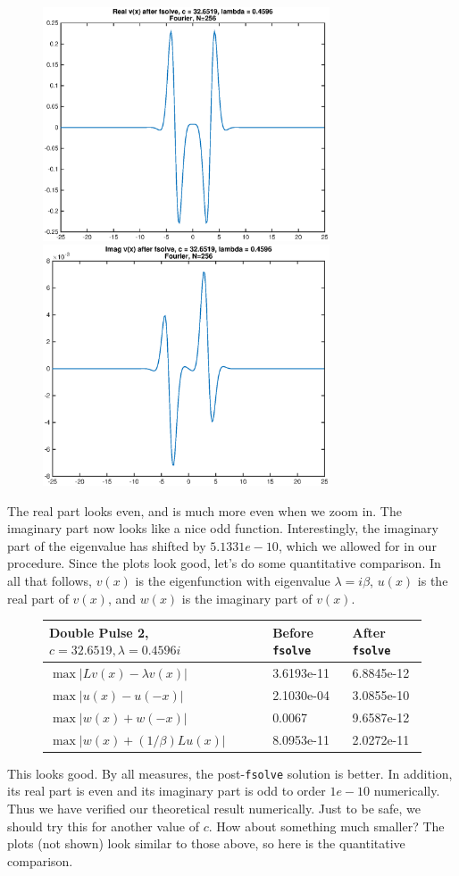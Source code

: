 \documentclass[12pt]{article}
\begin{document}
\begin{figure}[H]
\includegraphics[width=8.5cm]{1eigenfnrealafter.eps}
\includegraphics[width=8.5cm]{1eigenfnimagafter.eps}
\end{figure}
The real part looks even, and is much more even when we zoom in. The imaginary part now looks like a nice odd function. Interestingly, the imaginary part of the eigenvalue has shifted by $5.1331e-10$, which we allowed for in our procedure. Since the plots look good, let's do some quantitative comparison. In all that follows, $v(x)$ is the eigenfunction with eigenvalue $\lambda = i \beta$, $u(x)$ is the real part of $v(x)$, and $w(x)$ is the imaginary part of $v(x)$.

\begin{figure}[H]
\begin{tabular}{l|l|l}
 Double Pulse 2, $c = 32.6519, \lambda=0.4596i$  & Before \texttt{fsolve} & After \texttt{fsolve} \\ \hline
$\max|Lv(x) - \lambda v(x)|$  & 3.6193e-11 & 6.8845e-12 \\ 
$\max|u(x) - u(-x) |$         & 2.1030e-04 & 3.0855e-10 \\
$\max|w(x) + w(-x) |$         &  0.0067    & 9.6587e-12 \\
$\max|w(x) + (1/\beta)Lu(x)|$ &  8.0953e-11& 2.0272e-11 \\
\end{tabular}
\end{figure}
This looks good. By all measures, the post-\texttt{fsolve} solution is better. In addition, its real part is even and its imaginary part is odd to order $1e-10$ numerically. Thus we have verified our theoretical result numerically. Just to be safe, we should try this for another value of $c$. How about something much smaller? The plots (not shown) look similar to those above, so here is the quantitative comparison.
\end{document}
